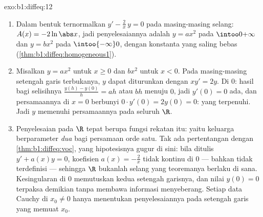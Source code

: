 \begin{solution}{exo:b1:diffeq:12}
\begin{enumerate}
  \item Dalam bentuk ternormalkan $y' - \frac2x\,y = 0$ pada masing-masing selang:
        $A(x) = -2\ln\abs x$, jadi penyelesaiannya adalah $y = a x^2$ pada
        $\intoo0{+\infty}$ dan $y = b x^2$ pada $\intoo{-\infty}0$,
        dengan konstanta yang saling bebas
        (\cref{thm:b1:diffeq:homogeneous1}).
  \item Misalkan $y = ax^2$ untuk $x \geq 0$ dan $bx^2$ untuk $x < 0$. Pada
        masing-masing setengah garis terbukanya, $y$ dapat diturunkan dengan $xy' = 2y$.
        Di $0$: hasil bagi selisihnya $\frac{y(h) - y(0)}h =
        ah$ atau $bh$ menuju $0$, jadi $y'(0) = 0$ ada, dan
        persamaannya di $x = 0$ berbunyi $0 \cdot y'(0) = 2y(0) = 0$:
        yang terpenuhi. Jadi $y$ memenuhi persamaannya pada seluruh $\R$.
  \item Penyelesaian pada $\R$ tepat berupa fungsi rekatan itu: yaitu
        keluarga berparameter \emph{dua} bagi persamaan orde satu.
        Tak ada pertentangan dengan \cref{thm:b1:diffeq:voc},
        yang hipotesisnya gugur di sini: bila ditulis $y' + a(x)y = 0$,
        koefisien $a(x) = -\frac2x$ tidak kontinu di $0$
        --- bahkan tidak terdefinisi --- sehingga $\R$ bukanlah selang
        yang teoremanya berlaku di sana. Kesingularan di $0$
        memutuskan kedua setengah garisnya, dan nilai $y(0) = 0$
        terpaksa demikian tanpa membawa informasi menyeberang. Setiap data
        Cauchy di $x_0 \neq 0$ hanya menentukan penyelesaiannya pada
        setengah garis yang memuat $x_0$.
\end{enumerate}
\end{solution}

